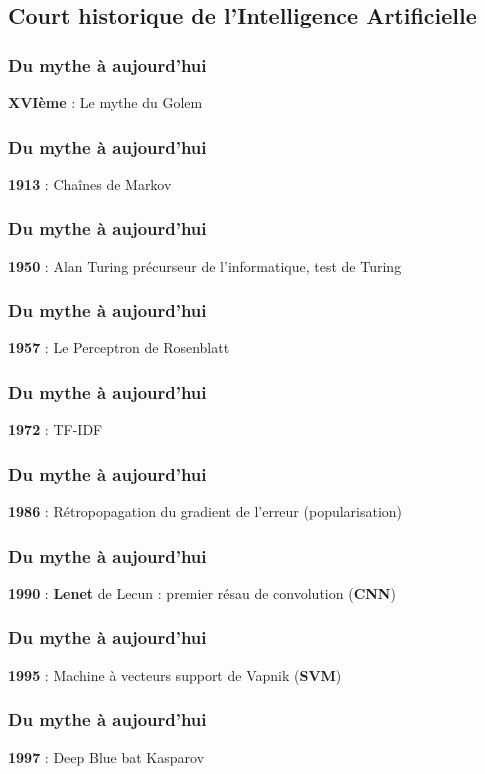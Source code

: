 \subsection{Court historique de l'Intelligence Artificielle}



\begin{frame}
  \frametitle{Du mythe à aujourd'hui}
  \textbf{XVIème} : Le mythe du Golem
\end{frame}

\begin{frame}
  \frametitle{Du mythe à aujourd'hui}
  \textbf{1913} : Chaînes de Markov
\end{frame}

\begin{frame}
  \frametitle{Du mythe à aujourd'hui}
  \textbf{1950} : Alan Turing
  précurseur de l'informatique, test de Turing
\end{frame}

\begin{frame}
  \frametitle{Du mythe à aujourd'hui}
  \textbf{1957} : Le Perceptron de Rosenblatt
\end{frame}

\begin{frame}
  \frametitle{Du mythe à aujourd'hui}
  \textbf{1972} :  TF-IDF
\end{frame}

\begin{frame}
  \frametitle{Du mythe à aujourd'hui}
  \textbf{1986} : Rétropopagation du gradient de l'erreur (popularisation)
\end{frame}

\begin{frame}
  \frametitle{Du mythe à aujourd'hui}
  \textbf{1990} : \textbf{Lenet} de Lecun : premier résau de convolution (\textbf{CNN})
\end{frame}

\begin{frame}
  \frametitle{Du mythe à aujourd'hui}
  \textbf{1995} : Machine à vecteurs support de Vapnik (\textbf{SVM})
\end{frame}

\begin{frame}
  \frametitle{Du mythe à aujourd'hui}
  \textbf{1997} : Deep Blue bat Kasparov
\end{frame}

